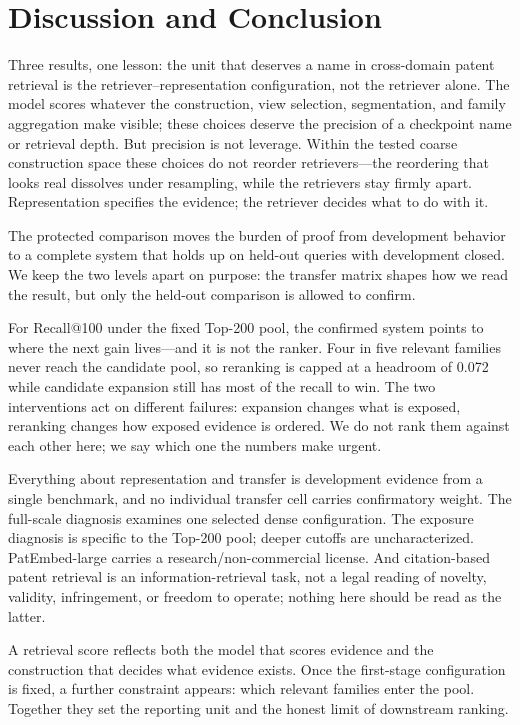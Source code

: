 \documentclass[a4paper,conference]{IEEEtran}
\begin{document}
\section{Discussion and Conclusion}

Three results, one lesson: the unit that deserves a name in cross-domain patent retrieval is the retriever--representation configuration, not the retriever alone. The model scores whatever the construction, view selection, segmentation, and family aggregation make visible; these choices deserve the precision of a checkpoint name or retrieval depth. But precision is not leverage. Within the tested coarse construction space these choices do not reorder retrievers---the reordering that looks real dissolves under resampling, while the retrievers stay firmly apart. Representation specifies the evidence; the retriever decides what to do with it.

The protected comparison moves the burden of proof from development behavior to a complete system that holds up on held-out queries with development closed. We keep the two levels apart on purpose: the transfer matrix shapes how we read the result, but only the held-out comparison is allowed to confirm.

For Recall@100 under the fixed Top-200 pool, the confirmed system points to where the next gain lives---and it is not the ranker. Four in five relevant families never reach the candidate pool, so reranking is capped at a headroom of 0.072 while candidate expansion still has most of the recall to win. The two interventions act on different failures: expansion changes what is exposed, reranking changes how exposed evidence is ordered. We do not rank them against each other here; we say which one the numbers make urgent.

Everything about representation and transfer is development evidence from a single benchmark, and no individual transfer cell carries confirmatory weight. The full-scale diagnosis examines one selected dense configuration. The exposure diagnosis is specific to the Top-200 pool; deeper cutoffs are uncharacterized. PatEmbed-large carries a research/non-commercial license. And citation-based patent retrieval is an information-retrieval task, not a legal reading of novelty, validity, infringement, or freedom to operate; nothing here should be read as the latter.

A retrieval score reflects both the model that scores evidence and the construction that decides what evidence exists. Once the first-stage configuration is fixed, a further constraint appears: which relevant families enter the pool. Together they set the reporting unit and the honest limit of downstream ranking.

\balance


\end{document}
